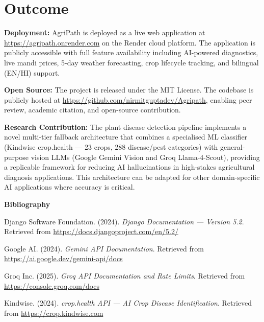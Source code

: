 \documentclass[12pt,a4paper]{article}
\begin{document}
\section{Outcome}

\textbf{Deployment:} AgriPath is deployed as a live web application at \url{https://agripath.onrender.com} on the Render cloud platform. The application is publicly accessible with full feature availability including AI-powered diagnostics, live mandi prices, 5-day weather forecasting, crop lifecycle tracking, and bilingual (EN/HI) support.

\textbf{Open Source:} The project is released under the MIT License. The codebase is publicly hosted at \url{https://github.com/nirmitguptadev/Agripath}, enabling peer review, academic citation, and open-source contribution.

\textbf{Research Contribution:} The plant disease detection pipeline implements a novel multi-tier fallback architecture that combines a specialised ML classifier (Kindwise crop.health --- 23 crops, 288 disease/pest categories) with general-purpose vision LLMs (Google Gemini Vision and Groq Llama-4-Scout), providing a replicable framework for reducing AI hallucinations in high-stakes agricultural diagnosis applications. This architecture can be adapted for other domain-specific AI applications where accuracy is critical.

\newpage
\begin{center}
    {\Large \textbf{Bibliography}}
\end{center}
\small

\noindent [1] Django Software Foundation. (2024). \textit{Django Documentation --- Version 5.2}. Retrieved from \url{https://docs.djangoproject.com/en/5.2/}

\noindent [2] Google AI. (2024). \textit{Gemini API Documentation}. Retrieved from \url{https://ai.google.dev/gemini-api/docs}

\noindent [3] Groq Inc. (2025). \textit{Groq API Documentation and Rate Limits}. Retrieved from \url{https://console.groq.com/docs}

\noindent [4] Kindwise. (2024). \textit{crop.health API --- AI Crop Disease Identification}. Retrieved from \url{https://crop.kindwise.com}
\end{document}

